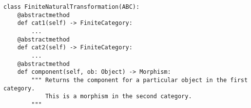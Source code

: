 \par\begin{minipage}{80ex}
\begin{verbatim}
class FiniteNaturalTransformation(ABC):
    @abstractmethod
    def cat1(self) -> FiniteCategory:
        ...
    @abstractmethod
    def cat2(self) -> FiniteCategory:
        ...
    @abstractmethod
    def component(self, ob: Object) -> Morphism:
        """ Returns the component for a particular object in the first category.
            This is a morphism in the second category.
        """
\end{verbatim}
\end{minipage}\par